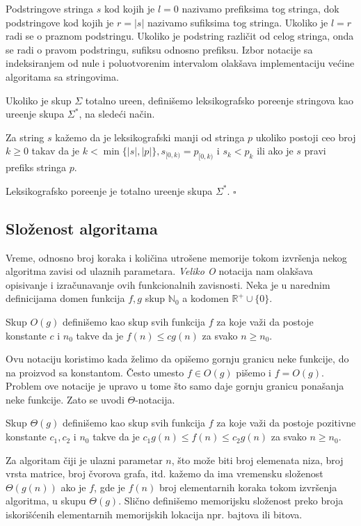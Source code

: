 Podstringove stringa $s$ kod kojih je $l=0$ nazivamo prefiksima tog stringa, dok podstringove kod kojih je $r=|s|$ nazivamo sufiksima tog stringa. Ukoliko je $l=r$ radi se o praznom podstringu. Ukoliko je podstring razli\v cit od celog stringa, onda se radi o pravom podstringu, sufiksu odnosno prefiksu. Izbor notacije sa indeksiranjem od nule i poluotvorenim intervalom olak\v sava implementaciju ve\' cine algoritama sa stringovima.

Ukoliko je skup $\Sigma$ totalno ure\dj en, defini\v semo leksikografsko pore\dj enje stringova kao ure\dj enje skupa $\Sigma^*$, na slede\' ci na\v cin.

\begin{dfn}
Za string $s$ ka\v zemo da je leksikografski manji od stringa $p$ ukoliko postoji ceo broj $k \geq 0$ takav da je $k < \min \{|s|, |p|\}, s_{[0, k)} = p_{[0, k)}$ i $s_k < p_k$ ili ako je $s$ pravi prefiks stringa $p$.
\end{dfn}

\begin{thm}
Leksikografsko pore\dj enje je totalno ure\dj enje skupa $\Sigma^*$. \hfill $\square$
\end{thm}

\subsection{Slo\v zenost algoritama}

Vreme, odnosno broj koraka i koli\v cina utro\v sene memorije tokom izvr\v senja nekog algoritma zavisi od ulaznih parametara. \textit{Veliko O} notacija nam olak\v sava opisivanje i izra\v cunavanje ovih funkcionalnih zavisnosti. Neka je u narednim definicijama domen funkcija $f, g$ skup $\mathbb{N}_0$ a kodomen $\mathbb{R}^{+} \cup \{ 0 \}$.

\begin{dfn}
Skup $O(g)$ defini\v semo kao skup svih funkcija $f$ za koje va\v zi da postoje konstante $c$ i $n_0$ takve da je $f(n) \leq c g(n)$ za svako $n \geq n_0$.
\end{dfn}

Ovu notaciju koristimo kada \v zelimo da opi\v semo gornju granicu neke funkcije, do na proizvod sa konstantom. \v Cesto umesto $f \in O(g)$ pi\v semo i $f = O(g)$. Problem ove notacije je upravo u tome \v sto samo daje gornju granicu pona\v sanja neke funkcije. Zato se uvodi $\Theta$-notacija.

\begin{dfn}
Skup $\Theta(g)$ defini\v semo kao skup svih funkcija $f$ za koje va\v zi da postoje pozitivne konstante $c_1, c_2$ i $n_0$ takve da je $c_1 g(n) \leq f(n) \leq c_2 g(n)$ za svako $n \geq n_0$.
\end{dfn}

Za algoritam \v ciji je ulazni parametar $n$, \v sto mo\v ze biti broj elemenata niza, broj vrsta matrice, broj \v cvorova grafa, itd. ka\v zemo da ima vremensku slo\v zenost $\Theta(g(n))$ ako je $f$, gde je $f(n)$ broj elementarnih koraka tokom izvr\v senja algoritma, u skupu $\Theta(g)$. Sli\v cno defini\v semo memorijsku slo\v zenost preko broja iskori\v s\' cenih elementarnih memorijskih lokacija npr. bajtova ili bitova.

